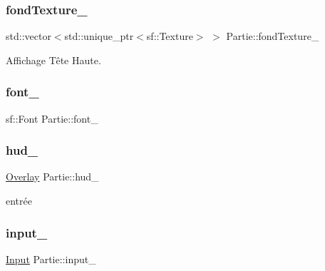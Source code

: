 \subsubsection{\texorpdfstring{fond\+Texture\+\_\+}{fondTexture\_}}
{\footnotesize\ttfamily std\+::vector$<$std\+::unique\+\_\+ptr$<$sf\+::\+Texture$>$ $>$ Partie\+::fond\+Texture\+\_\+\hspace{0.3cm}{\ttfamily [protected]}}



Affichage Tête Haute. 

\mbox{\label{class_partie_ab00aee0dc5c4a9eb16d17160bd6a707a}} 
\subsubsection{\texorpdfstring{font\+\_\+}{font\_}}
{\footnotesize\ttfamily sf\+::\+Font Partie\+::font\+\_\+\hspace{0.3cm}{\ttfamily [protected]}}

\mbox{\label{class_partie_a7d7dcc006ac52993ac65de1eae66bbf8}} 
\subsubsection{\texorpdfstring{hud\+\_\+}{hud\_}}
{\footnotesize\ttfamily \mbox{\hyperlink{class_overlay}{Overlay}} Partie\+::hud\+\_\+\hspace{0.3cm}{\ttfamily [protected]}}



entrée 

\mbox{\label{class_partie_a3a6f85686da661a2391dec412354c846}} 
\subsubsection{\texorpdfstring{input\+\_\+}{input\_}}
{\footnotesize\ttfamily \mbox{\hyperlink{_input_8h_a5588d60d674991c719a8df848313e966}{Input}} Partie\+::input\+\_\+\hspace{0.3cm}{\ttfamily [protected]}}



